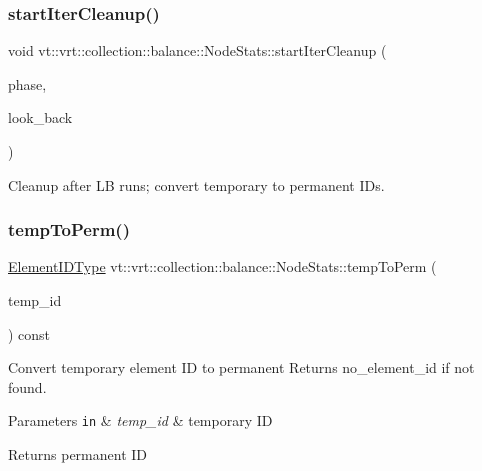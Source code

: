 \subsubsection{\texorpdfstring{start\+Iter\+Cleanup()}{startIterCleanup()}}
{\footnotesize\ttfamily void vt\+::vrt\+::collection\+::balance\+::\+Node\+Stats\+::start\+Iter\+Cleanup (\begin{DoxyParamCaption}\item[{\hyperlink{namespacevt_a46ce6733d5cdbd735d561b7b4029f6d7}{Phase\+Type}}]{phase,  }\item[{unsigned int}]{look\+\_\+back }\end{DoxyParamCaption})}



Cleanup after LB runs; convert temporary to permanent I\+Ds. 

\mbox{\label{structvt_1_1vrt_1_1collection_1_1balance_1_1_node_stats_a259d49b9aa4759b9d94be3e093fa2e6b}} 
\subsubsection{\texorpdfstring{temp\+To\+Perm()}{tempToPerm()}}
{\footnotesize\ttfamily \hyperlink{namespacevt_1_1vrt_1_1collection_1_1balance_a14c8d2c972f2913aa3f1636e5be0a120}{Element\+I\+D\+Type} vt\+::vrt\+::collection\+::balance\+::\+Node\+Stats\+::temp\+To\+Perm (\begin{DoxyParamCaption}\item[{\hyperlink{namespacevt_1_1vrt_1_1collection_1_1balance_a14c8d2c972f2913aa3f1636e5be0a120}{Element\+I\+D\+Type}}]{temp\+\_\+id }\end{DoxyParamCaption}) const}



Convert temporary element ID to permanent Returns {\ttfamily no\+\_\+element\+\_\+id} if not found. 


\begin{DoxyParams}[1]{Parameters}
\mbox{\tt in}  & {\em temp\+\_\+id} & temporary ID\\
\hline
\end{DoxyParams}
\begin{DoxyReturn}{Returns}
permanent ID 
\end{DoxyReturn}


